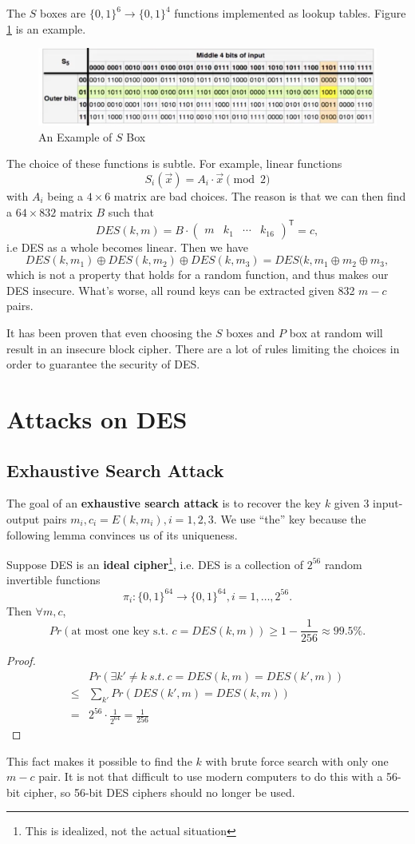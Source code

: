 The $S$ boxes are $\{0,1\}^6\rightarrow\{0,1\}^4$ functions implemented as lookup tables. Figure \ref{sboxeg} is an example.
\begin{figure}[ht]
\centering
\includegraphics[width=\textwidth]{sboxeg.jpg}
\caption{An Example of $S$ Box}\label{sboxeg}
\end{figure}

The choice of these functions is subtle. For example, linear functions 
\[S_i(\vec{x})=A_i\cdot\vec{x}\pmod 2\]
with $A_i$ being a $4\times 6$ matrix are bad choices. The reason is that we can then find a $64\times 832$ matrix $B$ such that 
\[DES(k,m)=B\cdot\begin{pmatrix}m&k_1&\cdots&k_{16}\end{pmatrix}^{\mathsf{T}}=c,\]
i.e DES as a whole becomes linear. Then we have 
\[DES(k,m_1)\oplus DES(k,m_2)\oplus DES(k,m_3)=DES(k,m_1\oplus m_2\oplus m_3,\]
which is not a property that holds for a random function, and thus makes our DES insecure. What's worse, all round keys can be extracted given 832 $m-c$ pairs.

It has been proven that even choosing the $S$ boxes and $P$ box at random will result in an insecure block cipher. There are a lot of rules limiting the choices in order to guarantee the security of DES.
\section{Attacks on DES}
\subsection{Exhaustive Search Attack}
The goal of an \textbf{exhaustive search attack} is to recover the key $k$ given 3 input-output pairs $m_i,c_i=E(k,m_i),i=1,2,3.$ We use ``the'' key because the following lemma convinces us of its uniqueness.
\begin{lemma}
Suppose DES is an \textbf{ideal cipher}\footnote{This is idealized, not the actual situation}, i.e. DES is a collection of $2^{56}$ random invertible functions 
\[\pi_i:\{0,1\}^{64}\rightarrow\{0,1\}^{64},i=1,\dots,2^{56}.\]
Then $\forall m,c$, 
\[Pr(\text{at most one key s.t. $c=DES(k,m)$})\geq 1-\frac{1}{256}\approx 99.5\%.\]
\end{lemma}
\begin{proof}
\begin{align*}
&Pr(\exists k'\neq k\:s.t.\:c=DES(k,m)=DES(k',m))\\
\leq&\sum\limits_{k'}Pr(DES(k',m)=DES(k,m))\\
=&2^{56}\cdot\frac{1}{2^{64}}=\frac{1}{256}
\end{align*}
\end{proof}
This fact makes it possible to find the $k$ with brute force search with only one $m-c$ pair. It is not that difficult to use modern computers to do this with a 56-bit cipher, so 56-bit DES ciphers should no longer be used. 

